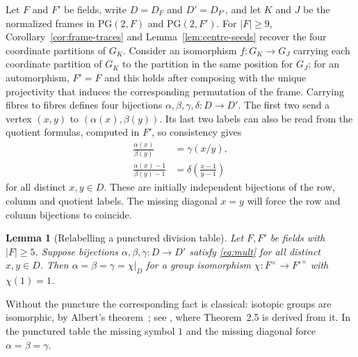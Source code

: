 \documentclass[11pt]{article}
\newtheorem{lemma}[theorem]{Lemma}
\theoremstyle{definition}
\theoremstyle{remark}
\newcommand{\PG}{\mathrm{PG}}
\begin{document}
Let $F$ and $F'$ be fields, write $D=D_F$ and $D'=D_{F'}$, and let $K$
and $J$ be the normalized frames in $\PG(2,F)$ and $\PG(2,F')$. For
$|F|\geq9$, Corollary~\ref{cor:frame-traces} and
Lemma~\ref{lem:centre-seeds} recover the four coordinate partitions of
$G_K$. Consider an isomorphism $f:G_K\to G_J$ carrying each coordinate
partition of $G_K$ to the partition in the same position for $G_J$; for
an automorphism, $F'=F$ and this holds after composing with the unique
projectivity that induces the corresponding permutation of the frame.
Carrying fibres to fibres defines four bijections
$\alpha,\beta,\gamma,\delta:D\to D'$. The first two send a vertex
$(x,y)$ to $(\alpha(x),\beta(y))$. Its last two labels can also be read
from the quotient formulas, computed in $F'$, so consistency gives
\begin{align}
 \frac{\alpha(x)}{\beta(y)}&=\gamma(x/y),\label{eq:mult}\\
 \frac{\alpha(x)-1}{\beta(y)-1}
   &=\delta\left(\frac{x-1}{y-1}\right)\label{eq:shift}
\end{align}
for all distinct $x,y\in D$. These are initially independent
bijections of the row, column and quotient labels. The missing diagonal
$x=y$ will force the row and column bijections to coincide.

\begin{lemma}[Relabelling a punctured division table]\label{lem:isotopy}
Let $F,F'$ be fields with $|F|\geq5$. Suppose bijections
$\alpha,\beta,\gamma:D\to D'$ satisfy \eqref{eq:mult} for all distinct
$x,y\in D$.  Then $\alpha=\beta=\gamma=\chi|_D$ for a group isomorphism
$\chi:F^\times\to F'^\times$ with $\chi(1)=1$.
\end{lemma}

Without the puncture the corresponding fact is classical: isotopic groups
are isomorphic, by Albert's theorem~\cite[Theorem~2]{Albert}; see
\cite[Section~2]{BCPS}, where Theorem~2.5 is derived from it. In the
punctured table the missing symbol $1$ and the missing diagonal force
$\alpha=\beta=\gamma$.
\end{document}
